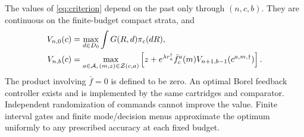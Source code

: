 \begin{theorem}\label{thm:bellman}
The values of \eqref{eq:criterion} depend on the past only through $(n,c,b)$. They are continuous on the finite-budget compact strata, and
\begin{align}
 V_{n,0}(c)&=\max_{d\in D_0}\int G(R,d)\pi_c(dR),\notag\\
 V_{n,b}(c)&=\max_{a\in\mathcal A,\,(m,z)\in\mathcal Z(c,a)}
 \left[z+e^{\lambda r_a^\dagger}\bar f_c^a(m)V_{n+1,b-1}(c^{a,m,\dagger})\right].
 \label{eq:bellman}
\end{align}
The product involving $\bar f=0$ is defined to be zero. An optimal Borel feedback controller exists and is implemented by the same cartridges and comparator. Independent randomization of commands cannot improve the value. Finite interval gates and finite mode/decision menus approximate the optimum uniformly to any prescribed accuracy at each fixed budget.
\end{theorem}
